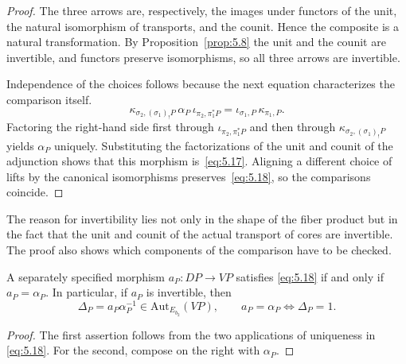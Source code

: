 \begin{proof}

The three arrows are, respectively, the images under functors of the unit, the natural
isomorphism of transports, and the counit. Hence the composite is a natural transformation.
By Proposition~\ref{prop:5.8} the unit and the counit are invertible, and functors preserve
isomorphisms, so all three arrows are invertible.

Independence of the choices follows because the next equation characterizes the comparison
itself.
\begin{equation*}
\kappa_{\sigma_2,(\sigma_1)_!P}\,
\alpha_P\,\iota_{\pi_2,\pi_1^*P}
=\iota_{\sigma_1,P}\,\kappa_{\pi_1,P}.
\tag{5.18}\label{eq:5.18}
\end{equation*}
Factoring the right-hand side first through $\iota_{\pi_2,\pi_1^*P}$ and then through
$\kappa_{\sigma_2,(\sigma_1)_!P}$ yields $\alpha_P$ uniquely. Substituting the
factorizations of the unit and counit of the adjunction shows that this morphism
is~\eqref{eq:5.17}. Aligning a different choice of lifts by the canonical isomorphisms
preserves~\eqref{eq:5.18}, so the comparisons coincide.

\end{proof}

The reason for invertibility lies not only in the shape of the fiber product but in the fact
that the unit and counit of the actual transport of cores are invertible. The proof also
shows which components of the comparison have to be checked.

\begin{proposition}\label{prop:5.12}

A separately specified morphism $a_P:DP\to VP$ satisfies \eqref{eq:5.18}
if and only if $a_P=\alpha_P$.
In particular, if $a_P$ is invertible, then
\begin{equation*}
\Delta_P=a_P\alpha_P^{-1}\in\mathrm{Aut}_{E_{b_2}}(VP),
\qquad
a_P=\alpha_P\Longleftrightarrow\Delta_P=1.
\tag{5.19}\label{eq:5.19}
\end{equation*}

\end{proposition}

\begin{proof}

The first assertion follows from the two applications of uniqueness in \eqref{eq:5.18}.
For the second, compose on the right with $\alpha_P$.

\end{proof}

